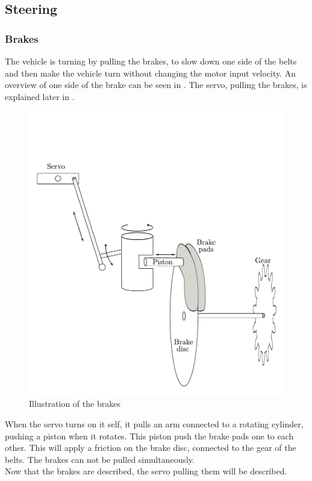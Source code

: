 \subsection{Steering}

\subsubsection{Brakes}
The vehicle is turning by pulling the brakes, to slow down one side of the belts and then make the vehicle turn without changing the motor input velocity. An overview of one side of the brake can be seen in . The servo, pulling the brakes, is explained later in .

 \begin{figure}[H]
	\centering
	\includegraphics[scale=0.6]{figures/brakeDescription.pdf}
	\caption{Illustration of the brakes}
	\label{Brakes}
\end{figure}

When the servo turns on it self, it pulls an arm connected to a rotating cylinder, pushing a piston when it rotates. This piston push the brake pads one to each other. This will apply a friction on the brake disc, connected to the gear of the belts. The brakes can not be pulled simultaneously.\\

Now that the brakes are described, the servo pulling them will be described.